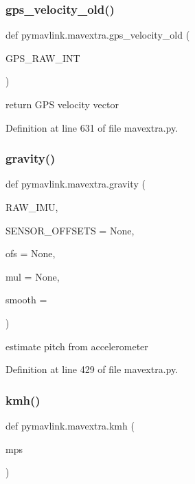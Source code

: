 \subsubsection{\texorpdfstring{gps\_velocity\_old()}{gps\_velocity\_old()}}
{\footnotesize\ttfamily def pymavlink.\+mavextra.\+gps\+\_\+velocity\+\_\+old (\begin{DoxyParamCaption}\item[{}]{G\+P\+S\+\_\+\+R\+A\+W\+\_\+\+I\+NT }\end{DoxyParamCaption})}

\begin{DoxyVerb}return GPS velocity vector\end{DoxyVerb}
 

Definition at line 631 of file mavextra.\+py.

\mbox{\label{namespacepymavlink_1_1mavextra_a762c44817d971674ece6d3c0cd90eedd}} 
\subsubsection{\texorpdfstring{gravity()}{gravity()}}
{\footnotesize\ttfamily def pymavlink.\+mavextra.\+gravity (\begin{DoxyParamCaption}\item[{}]{R\+A\+W\+\_\+\+I\+MU,  }\item[{}]{S\+E\+N\+S\+O\+R\+\_\+\+O\+F\+F\+S\+E\+TS = {\ttfamily None},  }\item[{}]{ofs = {\ttfamily None},  }\item[{}]{mul = {\ttfamily None},  }\item[{}]{smooth = {} }\end{DoxyParamCaption})}

\begin{DoxyVerb}estimate pitch from accelerometer\end{DoxyVerb}
 

Definition at line 429 of file mavextra.\+py.

\mbox{\label{namespacepymavlink_1_1mavextra_a763fb9e3242f5ec9ec1fec177c4e50ae}} 
\subsubsection{\texorpdfstring{kmh()}{kmh()}}
{\footnotesize\ttfamily def pymavlink.\+mavextra.\+kmh (\begin{DoxyParamCaption}\item[{}]{mps }\end{DoxyParamCaption})}

